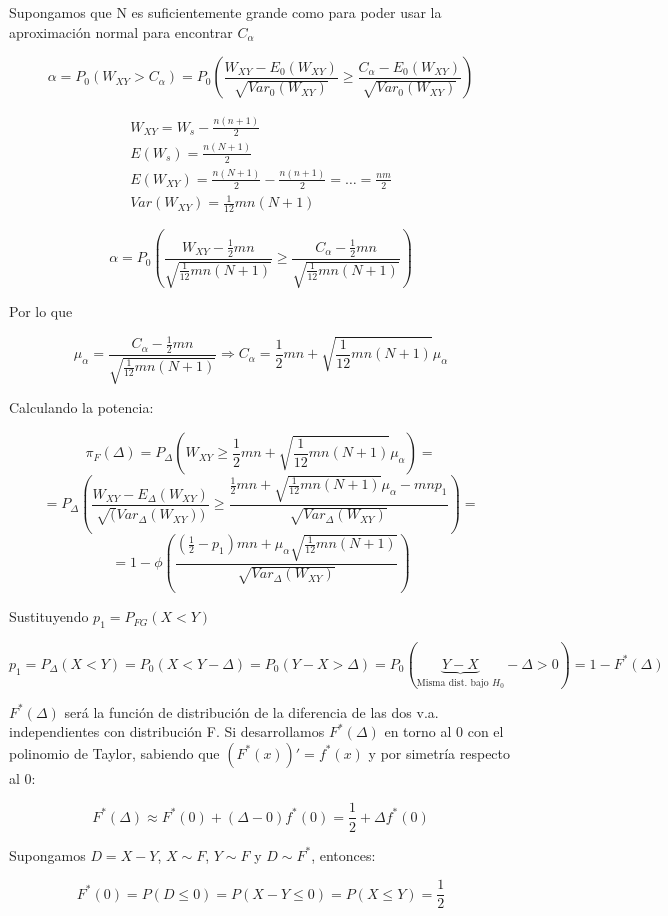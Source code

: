 Supongamos que N es suficientemente grande como para poder usar la aproximación normal para encontrar $C_\alpha$

$$
\alpha = P_0(W_{XY}>C_\alpha)=P_0\left(\frac{W_{XY}-E_0(W_{XY})}{\sqrt{Var_0(W_{XY})}}\geq \frac{C_\alpha-E_0(W_{XY})}{\sqrt{Var_0(W_{XY})}}\right)
$$

$$
\begin{array}{c}
    W_{XY}=W_s-\frac{n(n+1)}{2}\\
    E(W_s)=\frac{n(N+1)}{2}\\
    E(W_{XY})=\frac{n(N+1)}{2}-\frac{n(n+1)}{2}=\dots=\frac{nm}{2}\\
    Var(W_{XY})=\frac{1}{12}mn(N+1)
\end{array}
$$

$$
\alpha=P_0\left(\frac{W_{XY}-\frac{1}{2}mn}{\sqrt{\frac{1}{12}mn(N+1)}}\geq \frac{C_\alpha-\frac{1}{2}mn}{\sqrt{\frac{1}{12}mn(N+1)}}\right)
$$

Por lo que 

$$
\mu_\alpha=\frac{C_\alpha-\frac{1}{2}mn}{\sqrt{\frac{1}{12}mn(N+1)}} \Longrightarrow C_\alpha=\frac{1}{2}mn+\sqrt{\frac{1}{12}mn(N+1)}\mu_\alpha
$$

Calculando la potencia:

$$
\pi_F(\Delta)=P_\Delta\left(W_{XY}\geq\frac{1}{2}mn+\sqrt{\frac{1}{12}mn(N+1)}\mu_\alpha\right)=
$$
$$
=P_\Delta\left(\frac{W_{XY}-E_\Delta(W_{XY})}{\sqrt(Var_\Delta(W_{XY}))}\geq\frac{\frac{1}{2}mn+\sqrt{\frac{1}{12}mn(N+1)}\mu_\alpha-mnp_1}{\sqrt{Var_\Delta(W_{XY})}} \right)=
$$
$$
=1-\phi\left(\frac{\left(\frac{1}{2}-p_1\right)mn+\mu_\alpha\sqrt{\frac{1}{12}mn(N+1)}}{\sqrt{Var_\Delta(W_{XY})}}\right)
$$

Sustituyendo $p_1=P_{FG}(X<Y)$

$$
p_1=P_\Delta(X<Y)=P_0(X<Y-\Delta)=P_0(Y-X>\Delta)=P_0(\underbrace{Y-X}_\text{Misma dist. bajo $H_0$}-\Delta>0)=1-F^*(\Delta)
$$

$F^*(\Delta)$ será la función de distribución de la diferencia de las dos v.a. independientes con distribución F. Si desarrollamos $F^*(\Delta)$ en torno al 0 con el polinomio de Taylor, sabiendo que $(F^*(x))'=f^*(x)$ y por simetría respecto al 0:

$$
F^*(\Delta)\approx F^*(0)+(\Delta-0) f^*(0)=\frac{1}{2}+\Delta f^*(0)
$$

Supongamos $D=X-Y$, $X\sim F$, $Y\sim F$ y $D\sim F^*$, entonces:

$$
F^*(0)=P(D\leq 0)=P(X-Y\leq 0)=P(X\leq Y)=\frac{1}{2}
$$


